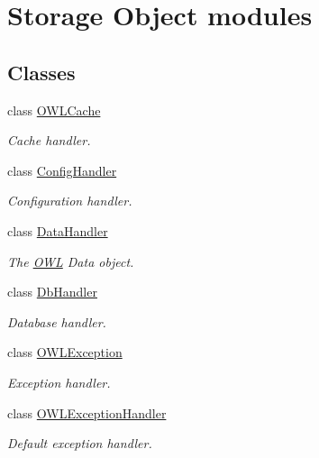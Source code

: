 \section{Storage Object modules}
\label{group__OWL__SO__LAYER}
\subsection*{Classes}
\begin{DoxyCompactItemize}
\item 
class \hyperlink{classOWLCache}{OWLCache}
\begin{DoxyCompactList}\small\item\em Cache handler. \item\end{DoxyCompactList}\item 
class \hyperlink{classConfigHandler}{ConfigHandler}
\begin{DoxyCompactList}\small\item\em Configuration handler. \item\end{DoxyCompactList}\item 
class \hyperlink{classDataHandler}{DataHandler}
\begin{DoxyCompactList}\small\item\em The \hyperlink{classOWL}{OWL} Data object. \item\end{DoxyCompactList}\item 
class \hyperlink{classDbHandler}{DbHandler}
\begin{DoxyCompactList}\small\item\em Database handler. \item\end{DoxyCompactList}\item 
class \hyperlink{classOWLException}{OWLException}
\begin{DoxyCompactList}\small\item\em Exception handler. \item\end{DoxyCompactList}\item 
class \hyperlink{classOWLExceptionHandler}{OWLExceptionHandler}
\begin{DoxyCompactList}\small\item\em Default exception handler. \item\end{DoxyCompactList}\item 

\end{DoxyCompactItemize}
